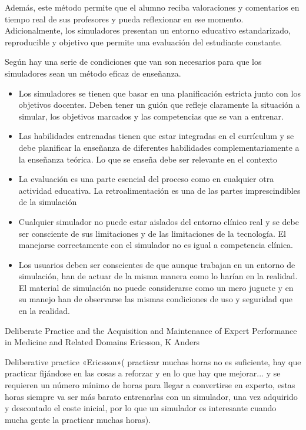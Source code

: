 Además, este método permite que el alumno reciba valoraciones y comentarios en tiempo real de sus profesores y pueda reflexionar en ese momento. Adicionalmente, los simuladores presentan un entorno educativo estandarizado, reproducible y objetivo que permite una evaluación del estudiante constante.

Según \cite{pales2010uso}hay una serie de condiciones que van son necesarios para que los simuladores sean un método eficaz de enseñanza.

\begin{itemize}
\item Los simuladores se tienen que basar en una planificación estricta junto con los objetivos docentes. Deben tener un guión que refleje claramente la situación a simular, los objetivos marcados y las competencias que se van a entrenar.

\item Las habilidades entrenadas tienen que estar integradas en el currículum  y se debe planificar la enseñanza de diferentes habilidades complementariamente a la enseñanza teórica. Lo que se enseña debe ser relevante en el contexto

\item La evaluación es una parte esencial del proceso como en cualquier otra actividad educativa. La retroalimentación es una de las partes imprescindibles de la simulación
\item Cualquier simulador no puede estar aislados del entorno clínico real y se debe ser consciente de sus limitaciones y de las limitaciones de la tecnología. El manejarse correctamente con el simulador no es igual a competencia clínica.
\item Los usuarios deben ser conscientes de que aunque trabajan en un entorno de simulación, han de actuar de la misma manera como lo harían en la realidad. El material de simulación no puede considerarse como un mero juguete y en su manejo han de observarse las mismas condiciones de uso y seguridad que en la realidad.

\end{itemize}

Deliberate Practice and the Acquisition and Maintenance of Expert Performance in Medicine and Related Domains
Ericsson, K Anders

Deliberative practice «Ericsson»( practicar muchas horas no es suficiente, hay que practicar fijándose en las cosas a reforzar y en lo que hay que mejorar... y se requieren un número mínimo de horas para llegar a convertirse en experto, estas horas siempre va ser más barato entrenarlas con un simulador, una vez adquirido y descontado el coste inicial, por lo que un simulador es interesante cuando mucha gente la practicar muchas horas).

